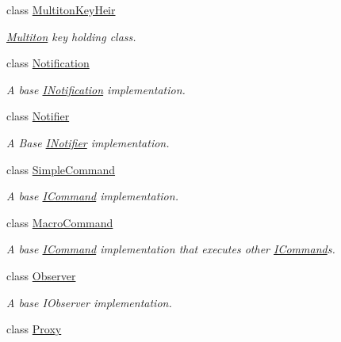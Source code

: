\begin{DoxyCompactItemize}
class \hyperlink{class_pure_m_v_c_1_1_multiton_key_heir}{MultitonKeyHeir}
\begin{DoxyCompactList}\small\item\em \hyperlink{class_pure_m_v_c_1_1_multiton}{Multiton} key holding class. \item\end{DoxyCompactList}\item 
class \hyperlink{class_pure_m_v_c_1_1_notification}{Notification}
\begin{DoxyCompactList}\small\item\em A base {\ttfamily \hyperlink{class_pure_m_v_c_1_1_i_notification}{INotification}} implementation. \item\end{DoxyCompactList}\item 
class \hyperlink{class_pure_m_v_c_1_1_notifier}{Notifier}
\begin{DoxyCompactList}\small\item\em A Base {\ttfamily \hyperlink{class_pure_m_v_c_1_1_i_notifier}{INotifier}} implementation. \item\end{DoxyCompactList}\item 
class \hyperlink{class_pure_m_v_c_1_1_simple_command}{SimpleCommand}
\begin{DoxyCompactList}\small\item\em A base {\ttfamily \hyperlink{class_pure_m_v_c_1_1_i_command}{ICommand}} implementation. \item\end{DoxyCompactList}\item 
class \hyperlink{class_pure_m_v_c_1_1_macro_command}{MacroCommand}
\begin{DoxyCompactList}\small\item\em A base {\ttfamily \hyperlink{class_pure_m_v_c_1_1_i_command}{ICommand}} implementation that executes other {\ttfamily \hyperlink{class_pure_m_v_c_1_1_i_command}{ICommand}}s. \item\end{DoxyCompactList}\item 
class \hyperlink{class_pure_m_v_c_1_1_observer}{Observer}
\begin{DoxyCompactList}\small\item\em A base {\ttfamily IObserver} implementation. \item\end{DoxyCompactList}\item 
class \hyperlink{class_pure_m_v_c_1_1_proxy}{Proxy}

\end{DoxyCompactItemize}
